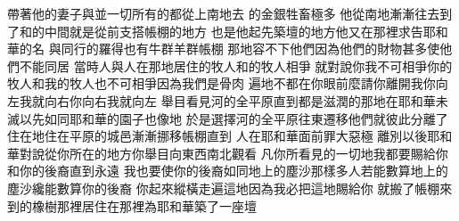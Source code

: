 \bchapter%
帶著他的妻子與\chientien 並一切所有的\chientien 都從上南地去\chuan 
{}的金\chientien 銀\chientien 牲畜極多\chuan 
{}他從南地漸漸往去\chientien 到了和的中間\chientien 就是從前支搭帳棚的地方\chientien 
{}也是他起先築壇的地方\yuentien 他又在那裡求告耶和華的名\chuan 
{}與同行的羅得\chientien 也有牛群\chientien 羊群\chientien 帳棚\chuan 
{}那地容不下他們\chientien 因為他們的財物甚多\chientien 使他們不能同居\chuan 
{}當時人\chientien 與人\chientien 在那地居住\yuentien {}的牧人\chientien 和的牧人相爭\chuan 
{}就對說\chientien 你我不可相爭\chientien 你的牧人和我的牧人也不可相爭\chientien 因為我們是骨肉\chuan\hss\linebreak{}
遍地不都在你眼前麼\yuentien 請你離開我\chientien 你向左\chientien 我就向右\chientien 你向右\chientien 我就向左\chuan 
{}舉目看見河的全平原\chientien 直到\chientien 都是滋潤的\chientien 那地在耶和華未滅\chientien {}以先\chientien 如同耶和華的園子\chientien 也像地\chuan 
{}於是選擇河的全平原\chientien 往東遷移\yuentien 他們就彼此分離了\chuan 
{}住在地\chientien{}住在平原的城邑\chientien 漸漸挪移帳棚\chientien 直到\chuan 
{}人在耶和華面前罪大惡極\chuan\Chuan
{}離別以後\chientien 耶和華對說\chientien 從你所在的地方\chientien 你舉目向東西南北觀看\yuentien 
{}凡你所看見的一切地\chientien 我都要賜給你和你的後裔\chientien 直到永遠\yuentien 
{}我也要使你的後裔如同地上的塵沙那樣多\chientien 人若能數算地上的塵沙\chientien 纔能數算你的後裔\chuan 
{}你起來\chientien 縱橫走遍這地\chientien 因為我必把這地賜給你\chuan 
{}就搬了帳棚\chientien 來到的橡樹那裡居住\chientien 在那裡為耶和華築了一座壇\chuan 

